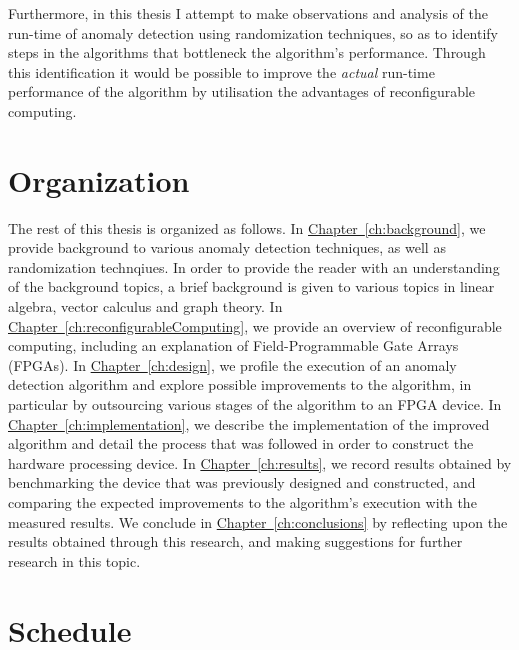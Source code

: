 Furthermore, in this thesis I attempt to make observations and analysis of the 
run-time of anomaly detection using randomization techniques, so as to identify
steps in the algorithms that bottleneck the algorithm's performance. Through 
this identification it would be possible to improve the \emph{actual} run-time 
performance of the algorithm by utilisation the advantages of reconfigurable 
computing.

\section{Organization}
\label{sec:organization}
The rest of this thesis is organized as follows. In \hyperref[ch:background]
{Chapter~\ref{ch:background}}, we provide background to various anomaly 
detection techniques, as well as randomization technqiues. In order to provide 
the reader with an understanding of the background topics, a brief background is
given to various topics in linear algebra, vector calculus and graph theory. In
\hyperref[ch:reconfigurableComputing]{Chapter~\ref{ch:reconfigurableComputing}}, 
we provide an overview of reconfigurable computing, including an explanation of 
Field-Programmable Gate Arrays (FPGAs). In \hyperref[ch:design]
{Chapter~\ref{ch:design}}, we profile the execution of an anomaly detection 
algorithm and explore possible improvements to the algorithm, in particular by 
outsourcing various stages of the algorithm to an FPGA device. In 
\hyperref[ch:implementation]{Chapter~\ref{ch:implementation}}, we describe the 
implementation of the improved algorithm and detail the process that was 
followed in order to construct the hardware processing device. In 
\hyperref[ch:results]{Chapter~\ref{ch:results}}, we record results obtained by 
benchmarking the device that was previously designed and constructed, and 
comparing the expected improvements to the algorithm's execution with the 
measured results. We conclude in \hyperref[ch:conclusions]
{Chapter~\ref{ch:conclusions}} by reflecting upon the results obtained through 
this research, and making suggestions for further research in this topic.
 
\section{Schedule}
\label{sec:schedule}
